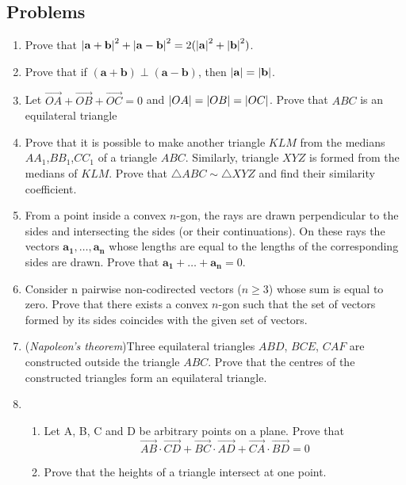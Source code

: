 \documentclass{article}
\begin{document}
\subsection{Problems}
\begin{enumerate}
\item
Prove that $\abs{\mathbf{a} + \mathbf{b}}^2 + \abs{\mathbf{a} - \mathbf{b}}^2 = 2(\abs{\mathbf{a}}^2 + \abs{\mathbf{b}}^2)$.

\item
Prove that if $(\mathbf{a}+\mathbf{b}) \perp (\mathbf{a}-\mathbf{b})$, then $\abs{\mathbf{a}} = \abs{\mathbf{b}}$.

\item 
Let $\overrightarrow{OA} + \overrightarrow{OB} + \overrightarrow{OC} = 0$ and $\abs{OA}=\abs{OB}=\abs{OC}$. Prove that $ABC$ is an equilateral triangle

\item %
Prove that it is possible to make another triangle $KLM$ from the medians $AA_1$,$BB_1$,$CC_1$ of a triangle $ABC$. Similarly, triangle $XYZ$ is formed from the medians of $KLM$. Prove that $\triangle ABC \sim \triangle XYZ$ and find their similarity coefficient. 

\item %
From a point inside a convex $n$-gon, the rays are drawn perpendicular to the sides and intersecting the sides (or their continuations). On these rays the vectors $\mathbf{a_1}, \dots , \mathbf{a_n}$ whose lengths are equal to the lengths of the corresponding sides are drawn. Prove that
$\mathbf{a_1} + \dots + \mathbf{a_n} = 0$.


\item %
Consider n pairwise non-codirected vectors ($n \geq 3$) whose sum is equal to zero. Prove that there exists a convex $n$-gon such that the set of vectors formed by its sides coincides with the given set of vectors.

\item %
(\emph{Napoleon's theorem})Three equilateral triangles $ABD$, $BCE$, $CAF$ are constructed outside the triangle $ABC$. Prove that the centres of the constructed triangles form an equilateral triangle. 

\item %
\begin{enumerate}
\item Let A, B, C and D be arbitrary points on a plane. Prove that
$$ \overrightarrow{AB} \cdot \overrightarrow{CD} +
\overrightarrow{BC} \cdot \overrightarrow{AD} +
\overrightarrow{CA} \cdot \overrightarrow{BD} = 0
 $$
\item Prove that the heights of a triangle intersect at one point.	
\end{enumerate}


\end{enumerate}
\end{document}
